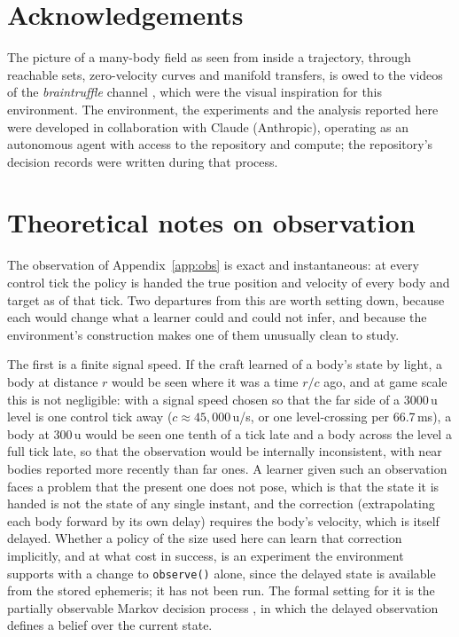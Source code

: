 \documentclass[11pt]{article}
\newcommand{\code}[1]{\texttt{\small #1}}
\begin{document}
\section*{Acknowledgements}

The picture of a many-body field as seen from inside a trajectory, through
reachable sets, zero-velocity curves and manifold transfers, is owed to the
videos of the \emph{braintruffle} channel
\cite{braintruffle2024,braintruffle2024a,braintruffle2025}, which were the
visual inspiration for this environment. The environment, the experiments
and the analysis reported here were developed in collaboration with Claude
(Anthropic), operating as an autonomous agent with access to the repository
and compute; the repository's decision records were written during that
process.

\appendix


\section{Theoretical notes on observation}
\label{app:theory}

The observation of Appendix~\ref{app:obs} is exact and instantaneous: at
every control tick the policy is handed the true position and velocity of
every body and target as of that tick. Two departures from this are worth
setting down, because each would change what a learner could and could not
infer, and because the environment's construction makes one of them
unusually clean to study.

The first is a finite signal speed. If the craft learned of a body's state
by light, a body at distance $r$ would be seen where it was a time $r/c$
ago, and at game scale this is not negligible: with a signal speed chosen so
that the far side of a 3000\,u level is one control tick away ($c \approx
45{,}000$\,u/s, or one level-crossing per 66.7\,ms), a body at 300\,u would
be seen one tenth of a tick late and a body across the level a full tick
late, so that the observation would be internally inconsistent, with near
bodies reported more recently than far ones. A learner given such an
observation faces a problem that the present one does not pose, which is
that the state it is handed is not the state of any single instant, and the
correction (extrapolating each body forward by its own delay) requires the
body's velocity, which is itself delayed. Whether a policy of the size used
here can learn that correction implicitly, and at what cost in success, is
an experiment the environment supports with a change to \code{observe()}
alone, since the delayed state is available from the stored ephemeris; it
has not been run. The formal setting for it is the partially observable
Markov decision process \cite{kaelbling1998}, in which the delayed
observation defines a belief over the current state.
\end{document}
